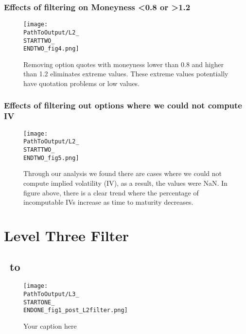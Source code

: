 \begin{appendix}
\subsubsection{Effects of filtering on Moneyness <0.8 or >1.2}
\begin{figure}[H] %
  \centering
{}
  \texttt{[image: \\PathToOutput/L2\_\\STARTTWO\_\\ENDTWO\_fig4.png]}%
\captionsetup{font=normalfont}
  \caption{Removing option quotes with moneyness lower than 0.8 and higher than 1.2 eliminates extreme values. These extreme values potentially have quotation problems or low values.}
  \label{fig:time2lvl2fig4}
\end{figure}


\subsubsection{Effects of filtering out options where we could not compute IV}
\begin{figure}[H] %
  \centering
{}
  \texttt{[image: \\PathToOutput/L2\_\\STARTTWO\_\\ENDTWO\_fig5.png]}%
\captionsetup{font=normalfont}
  \caption{Through our analysis we found there are cases where we could not compute implied volatility (IV), as a result, the values were NaN. In figure above, there is a clear trend where the percentage of incomputable IVs increase as time to maturity decreases.}
 \label{fig:time2lvl2fig5}
\end{figure}




\newpage
\section{Level Three Filter}\label{app:lvl3}
\subsection{\STARTONE\ to \ENDONE }

\begin{figure}[H] %
  \centering
  \texttt{[image: \\PathToOutput/L3\_\\STARTONE\_\\ENDONE\_fig1\_post\_L2filter.png]}%
  \caption{Your caption here}
 \label{fig:time1lvl3fig1}
\end{figure}



\end{appendix}
